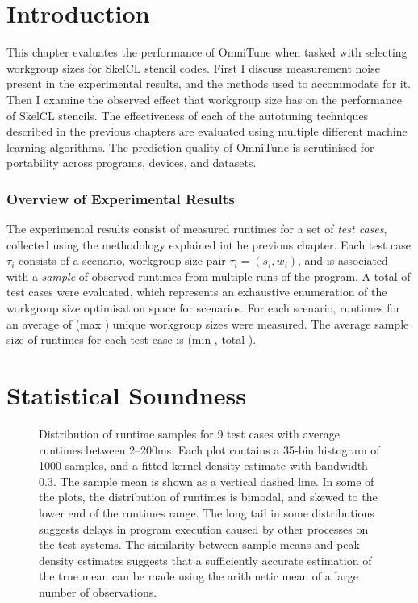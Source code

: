 \section{Introduction}

This chapter evaluates the performance of OmniTune when tasked with
selecting workgroup sizes for SkelCL stencil codes. First I discuss
measurement noise present in the experimental results, and the methods
used to accommodate for it. Then I examine the observed effect that
workgroup size has on the performance of SkelCL stencils. The
effectiveness of each of the autotuning techniques described in the
previous chapters are evaluated using multiple different machine
learning algorithms. The prediction quality of OmniTune is scrutinised
for portability across programs, devices, and datasets.


\subsubsection{Overview of Experimental Results}

The experimental results consist of measured runtimes for a set of
\emph{test cases}, collected using the methodology explained int he
previous chapter. Each test case $\tau_i$ consists of a scenario,
workgroup size pair $\tau_i = (s_i,w_i)$, and is associated with a
\emph{sample} of observed runtimes from multiple runs of the
program. A total of  test cases were
evaluated, which represents an exhaustive enumeration of the workgroup
size optimisation space for  scenarios. For
each scenario, runtimes for an average of 
(max ) unique workgroup sizes were
measured. The average sample size of runtimes for each test case is
 (min , total
).


\section{Statistical Soundness}

\begin{figure}

\caption{%
  Distribution of runtime samples for 9 test cases with average
  runtimes between 2--200ms. Each plot contains a 35-bin histogram of
  1000 samples, and a fitted kernel density estimate with bandwidth
  0.3. The sample mean is shown as a vertical dashed line. In some of
  the plots, the distribution of runtimes is bimodal, and skewed to
  the lower end of the runtimes range. The long tail in some
  distributions suggests delays in program execution caused by other
  processes on the test systems. The similarity between sample means
  and peak density estimates suggests that a sufficiently accurate
  estimation of the true mean can be made using the arithmetic mean of
  a large number of observations.%
}
\label{fig:runtime-histograms}
\end{figure}

